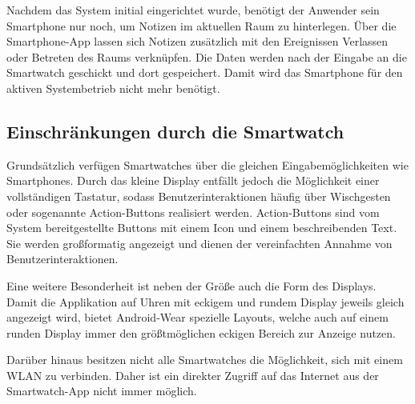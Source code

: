 Nachdem das System initial eingerichtet wurde, benötigt der Anwender sein Smartphone nur noch, um Notizen im aktuellen Raum zu hinterlegen. Über die Smartphone-App lassen sich Notizen zusätzlich mit den Ereignissen Verlassen oder Betreten des Raums verknüpfen. Die Daten werden nach der Eingabe an die Smartwatch geschickt und dort gespeichert. Damit wird das Smartphone für den aktiven Systembetrieb nicht mehr benötigt.

\subsection{Einschränkungen durch die Smartwatch}
\label{sec:einschraenkungen}
Grundsätzlich verfügen Smartwatches über die gleichen Eingabemöglichkeiten wie Smartphones. Durch das kleine Display entfällt jedoch die Möglichkeit einer vollständigen Tastatur, sodass Benutzerinteraktionen häufig über Wischgesten oder sogenannte Action-Buttons realisiert werden. Action-Buttons sind vom System bereitgestellte Buttons mit einem Icon und einem beschreibenden Text. Sie werden großformatig angezeigt und dienen der vereinfachten Annahme von Benutzerinteraktionen.

Eine weitere Besonderheit ist neben der Größe auch die Form des Displays. Damit die Applikation auf Uhren mit eckigem und rundem Display jeweils gleich angezeigt wird, bietet Android-Wear spezielle Layouts, welche auch auf einem runden Display immer den größtmöglichen eckigen Bereich zur Anzeige nutzen.

Darüber hinaus besitzen nicht alle Smartwatches die Möglichkeit, sich mit einem WLAN zu verbinden. Daher ist ein direkter Zugriff auf das Internet aus der Smartwatch-App nicht immer möglich.
